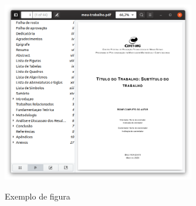 \begin{apendicesenv}
    \begin{figure}[!htb]
        \centering
        \caption{Exemplo de figura}
        \includegraphics[width=0.75\textwidth]{figuras/figura-exemplo.png}
        \label{fig_figura_exemplo}
    \end{figure}


\end{apendicesenv}
